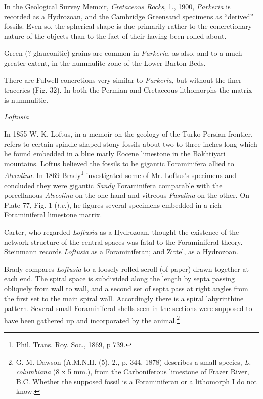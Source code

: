 \documentclass[a4paper, 12pt, oneside]{article}
\begin{document}
In the Geological Survey Memoir, \emph{Cretaceous Rocks}, 1., 1900, \emph{Parkeria} is recorded as a Hydrozoan, and the Cambridge Greensand specimens as ``derived'' fossils. Even so, the spherical shape is due primarily rather to the concretionary nature of the objects than to the fact of their having been rolled about.

Green (? glauconitic) grains are common in \emph{Parkeria}, as also, and to a much greater extent, in the nummulite zone of the Lower Barton Beds.

There are Fulwell concretions very similar to \emph{Parkeria}, but without the finer traceries (Fig. 32). In both the Permian and Cretaceous lithomorphs the matrix is nummulitic.

\bigskip
\centerline{\emph{Loftusia}}

In 1855 W. K. Loftus, in a memoir on the geology of the Turko-Persian frontier, refers to certain spindle-shaped stony fossils about two to three inches long which he found embedded in a blue marly Eocene limestone in the Bakhtiyari mountains. Loftus believed the fossils to be gigantic Foraminifera allied to \emph{Alveolina}. In 1869 Brady\footnote{Phil. Trans. Roy. Soc., 1869, p 739.} investigated some of Mr. Loftus's specimens and concluded they were gigantic \emph{Sandy} Foraminifera comparable with the porcellanous \emph{Alveolina} on the one hand and vitreous \emph{Fusulina} on the other. On Plate 77, Fig. 1 (\emph{l.c.}), he figures several specimens embedded in a rich Foraminiferal limestone matrix.

Carter, who regarded \emph{Loftusia} as a Hydrozoan, thought the existence of the network structure of the central spaces was fatal to the Foraminiferal theory. Steinmann records \emph{Loftusia} as a Foraminiferan; and Zittel, as a Hydrozoan.

Brady compares \emph{Loftusia} to a loosely rolled scroll (of paper) drawn together at each end. The spiral space is subdivided along the length by septa passing obliquely from wall to wall, and a second set of septa pass at right angles from the first set to the main spiral wall. Accordingly there is a spiral labyrinthine pattern. Several small Foraminiferal shells seen in the sections were supposed to have been gathered up and incorporated by the animal.\footnote{G. M. Dawson (A.M.N.H. (5), 2., p. 344, 1878) describes a small species, \emph{L. columbiana} (8 x 5 mm.), from the Carboniferous limestone of Frazer River, B.C. Whether the supposed fossil is a Foraminiferan or a lithomorph I do not know.}
\end{document}
